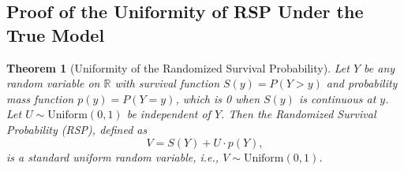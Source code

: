 \documentclass[
  12pt]{article}
\theoremstyle{plain}
\newtheorem{theorem}{Theorem}[section]
\theoremstyle{definition}
\theoremstyle{remark}
\begin{document}
 

\subsection{Proof of the Uniformity of RSP Under the True Model}
\begin{theorem}[Uniformity of the Randomized Survival Probability]
Let $Y$ be any random variable on $\mathbb{R}$ with survival function $S(y) = P(Y>y)$ and probability mass function $p(y) = P(Y=y)$, which is 0 when $S(y)$ is continuous at $y$. Let $U \sim \text{Uniform}(0,1)$ be independent of $Y$. Then the Randomized Survival Probability (RSP), defined as
\begin{equation}
V = S(Y) + U \cdot p(Y),
\end{equation}
is a standard uniform random variable, i.e., $V \sim \text{Uniform}(0,1)$.
\label{thm:rspunif}
\end{theorem}
\end{document}
